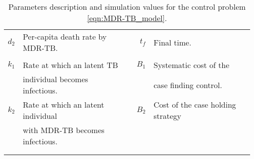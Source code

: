 \begin{table}[htb]
\begin{tabular}{rllrl}
          \\
      $d_2$ 
          & Per-capita  death rate by MDR-TB.
          &&
            $t_f$ 
              & Final time.
          \\
      \\
      $k_1$ 
        & Rate at which an latent TB 
        &&
          $B_1$ 
            &
              Systematic cost of the
        \\
        & individual becomes infectious. 
          &&&
            case finding  control.
      \\
          $k_2$  
          & Rate at which an latent individual
          &&
            $B_2$
            & 
            Cost of the case holding strategy
          \\
          & with MDR-TB becomes infectious.
    \\
    \\
%
%      
%      
%       
%            
%          
%         
         \\
    \bottomrule
    \end{tabular}
  \caption{Parameters description and simulation values for the control 
  problem \eqref{eqn:MDR-TB_model}.}
  \label{tbl:parameters_MDR-TB_model}
\end{table}

%
